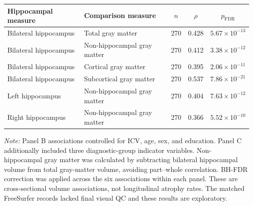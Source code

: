 \documentclass{article}
\begin{document}
\begin{table}[!htbp]
\vspace{1mm}
\begin{tabular}{@{}>{\raggedright\arraybackslash}p{4.0cm}>{\raggedright\arraybackslash}p{4.3cm}ccc@{}}
\toprule
\textbf{Hippocampal measure} & \textbf{Comparison measure} & \textbf{\(n\)} & \textbf{\(\rho\)} & \textbf{\(p_{\mathrm{FDR}}\)}\\
\midrule
Bilateral hippocampus & Total gray matter & 270 & 0.428 & \(5.67\times10^{-13}\) \\
Bilateral hippocampus & Non-hippocampal gray matter & 270 & 0.412 & \(3.38\times10^{-12}\) \\
Bilateral hippocampus & Cortical gray matter & 270 & 0.395 & \(2.06\times10^{-11}\) \\
Bilateral hippocampus & Subcortical gray matter & 270 & 0.537 & \(7.86\times10^{-21}\) \\
Left hippocampus & Non-hippocampal gray matter & 270 & 0.404 & \(7.63\times10^{-12}\) \\
Right hippocampus & Non-hippocampal gray matter & 270 & 0.366 & \(5.52\times10^{-10}\) \\
\bottomrule
\end{tabular}

\vspace{1mm}
\footnotesize{\textit{Note:} Panel B associations controlled for ICV, age, sex, and education. Panel C additionally included three diagnostic-group indicator variables. Non-hippocampal gray matter was calculated by subtracting bilateral hippocampal volume from total gray-matter volume, avoiding part--whole correlation. BH-FDR correction was applied across the six associations within each panel. These are cross-sectional volume associations, not longitudinal atrophy rates. The matched FreeSurfer records lacked final visual QC and these results are exploratory.}

\end{table}
\end{document}
